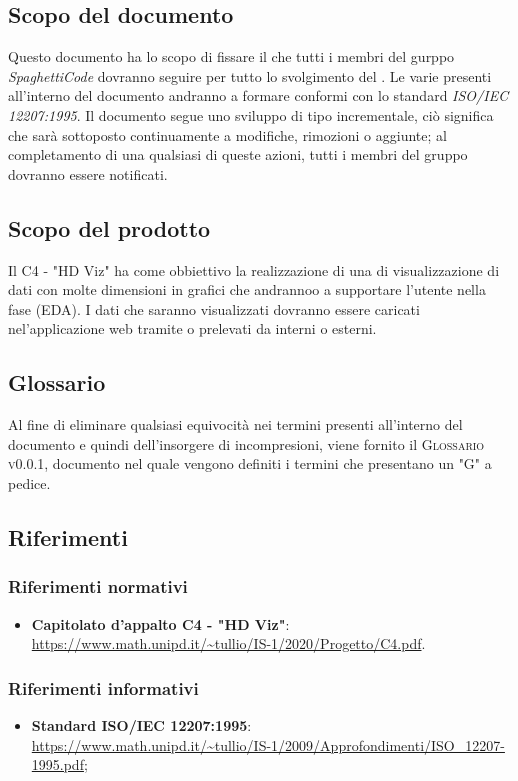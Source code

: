 \documentclass[../norme-di-progetto.tex]{subfiles}
\begin{document}
\subsection{Scopo del documento}
Questo documento ha lo scopo di fissare il  che tutti i membri del gurppo \emph{SpaghettiCode} dovranno seguire per tutto lo svolgimento del .
Le varie  presenti all'interno del documento andranno a formare  conformi con lo standard \emph{ISO/IEC 12207:1995}.
Il documento segue uno sviluppo di tipo incrementale, ciò significa che sarà sottoposto continuamente a modifiche, rimozioni o aggiunte; al completamento di una qualsiasi di queste azioni, tutti i membri del gruppo dovranno essere notificati.

\subsection{Scopo del prodotto}
Il  C4 - "HD Viz" ha come obbiettivo la realizzazione di una  di visualizzazione di dati con molte dimensioni in grafici che andrannoo a supportare l'utente nella fase  (EDA).
I dati che saranno visualizzati dovranno essere caricati nel'applicazione web tramite  o prelevati da  interni o esterni.

\subsection{Glossario}
Al fine di eliminare qualsiasi equivocità nei termini presenti all'interno del documento e quindi dell'insorgere di incompresioni, viene fornito il \textsc{Glossario v0.0.1}, documento nel quale vengono definiti i termini che presentano un "G" a pedice.

\subsection{Riferimenti}
\subsubsection{Riferimenti normativi}
\begin{itemize}
    \item \textbf{Capitolato d'appalto C4 - "HD Viz"}: \\ \url{https://www.math.unipd.it/~tullio/IS-1/2020/Progetto/C4.pdf}.
\end{itemize}

\subsubsection{Riferimenti informativi}
\begin{itemize}
    \item \textbf{Standard ISO/IEC 12207:1995}: \\ \url{https://www.math.unipd.it/~tullio/IS-1/2009/Approfondimenti/ISO_12207-1995.pdf};
\end{itemize}
\end{document}
